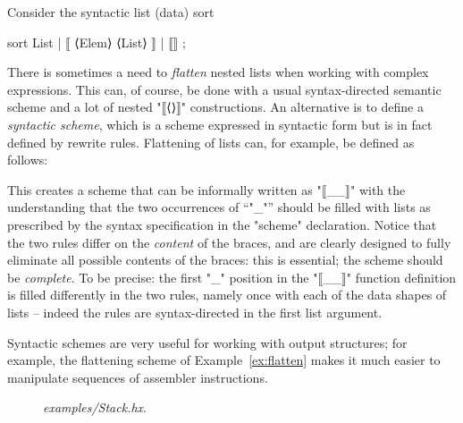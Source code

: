 \documentclass[11pt]{article} %
\begin{document}
\begin{example}\label{ex:flatten}
  Consider the syntactic list (data) sort
  \begin{hacs}[xleftmargin=\parindent,xrightmargin=\parindent]
sort List | ⟦ ⟨Elem⟩ ⟨List⟩ ⟧ | ⟦⟧ ;
  \end{hacs}
  There is sometimes a need to \emph{flatten} nested lists when working with complex expressions.
  This can, of course, be done with a usual syntax-directed semantic scheme and a lot of nested
  "⟦⟨⟩⟧" constructions. An alternative is to define a \emph{syntactic scheme}, which is a scheme
  expressed in syntactic form but is in fact defined by rewrite rules. Flattening of lists can, for
  example, be defined as follows:
  This creates a scheme that can be informally written as "⟦{_}_⟧" with the understanding that the
  two occurrences of ``"_"'' should be filled with lists as prescribed by the syntax specification
  in the "scheme" declaration. Notice that the two rules differ on the \emph{content} of the braces,
  and are clearly designed to fully eliminate all possible contents of the braces: this is
  essential; the scheme should be \emph{complete}. To be precise: the first "_" position in the
  "⟦{_}_⟧" function definition is filled differently in the two rules, namely once with each of the
  data shapes of lists -- indeed the rules are syntax-directed in the first list argument.
\end{example}

Syntactic schemes are very useful for working with output structures; for example, the flattening
scheme of Example~\ref{ex:flatten} makes it much easier to manipulate sequences of assembler
instructions.

\begin{figure}[p]
  \caption{\emph{examples/Stack.hx}.}
  \label{fig:stack}
\end{figure}
\end{document}
